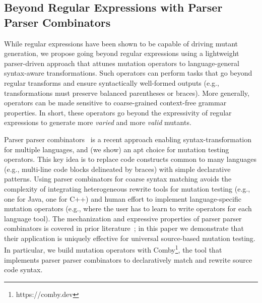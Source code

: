 \documentclass[sigconf,review, anonymous]{acmart}
\begin{document}
{\subsection{Beyond Regular Expressions with Parser Parser Combinators}




While regular expressions have been shown to be capable of driving mutant generation, we
propose going beyond regular expressions using a lightweight
parser-driven approach that attunes mutation operators to
language-general syntax-aware transformations. Such operators can
perform tasks that go beyond regular transforms and ensure
syntactically well-formed outputs (e.g., transformations must preserve
balanced parentheses or braces). More generally, operators can be made
sensitive to coarse-grained context-free grammar properties. In short,
these
operators go beyond the expressivity of regular expressions to generate more
\emph{varied} and more \emph{valid} mutants.

Parser parser combinators~\cite{vanTonderPPC} is a recent approach enabling
syntax-transformation for multiple languages, and (we show) an apt choice for
mutation testing operators. This key idea is to replace code constructs
common to many languages (e.g., multi-line code blocks delineated by braces)
with simple declarative patterns. Using parser combinators for coarse syntax
matching avoids the complexity of integrating heterogeneous rewrite tools for
mutation testing (e.g., one for Java, one for C++) and human effort to
implement language-specific mutation operators (e.g., where the user has to
learn to write operators for each language tool). The mechanization and
expressive properties of parser parser combinators is covered in prior
literature~\cite{vanTonderPPC}; in this paper we demonstrate that their application is
uniquely effective for universal source-based mutation testing. In
particular, we
build mutation operators with Comby\footnote{https://comby.dev}, the tool that implements parser parser
combinators to declaratively match and rewrite source code syntax. 

}
\end{document}
